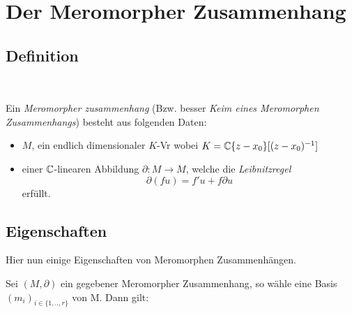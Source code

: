\chapter{Der Meromorpher Zusammenhang}
\section{Definition}~

\begin{defn}
  Ein \emph{Meromorpher zusammenhang} (Bzw. besser \emph{Keim eines Meromorphen
    Zusammenhangs}) besteht aus folgenden Daten:
  \begin{itemize}
    \item $M$, ein endlich dimensionaler $K$-Vr wobei $K={\mathbb C}\{z-x_0\}[(z-x_0)^{-1}]$
    \item einer ${\mathbb C}$-linearen Abbildung $\partial:M\rightarrow M$, welche die
      \emph{Leibnitzregel}
      $$\partial(fu)=f'u+f\partial u$$
      erfüllt.
  \end{itemize}
\end{defn}

\section{Eigenschaften}
Hier nun einige Eigenschaften von Meromorphen Zusammenhängen.

Sei $(M,\partial)$ ein gegebener Meromorpher Zusammenhang, so wähle eine Basis
$(m_i)_{i\in\{1,..,r\}}$ von M. Dann gilt:
\begin{center}
\end{center}

